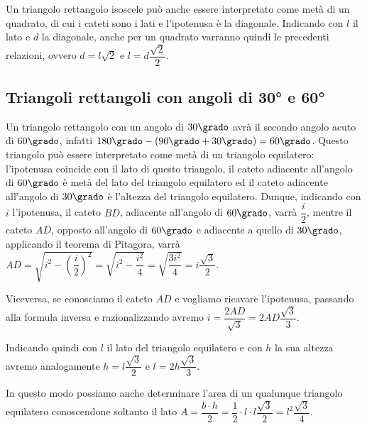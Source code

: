 Un triangolo rettangolo isoscele può anche essere interpretato come 
metà di un quadrato, di cui i cateti sono i lati e l'ipotenusa è la 
diagonale.
Indicando con $l$ il lato e $d$ la diagonale, anche per un quadrato 
varranno quindi le precedenti relazioni, ovvero $d=l\sqrt{2}$ e 
$l=d\dfrac{\sqrt{2}}{2}$.

\subsection{Triangoli rettangoli con angoli di 30° e 60°}

\begin{wrapfigure}{r}{0.25\textwidth}
	\centering
\end{wrapfigure}
Un triangolo rettangolo con un angolo di $30\grado$ avrà il secondo 
angolo acuto di $60\grado$, infatti $180\grado- 
(90\grado+30\grado)=60\grado$. Questo triangolo può essere 
interpretato come metà di un triangolo equilatero: l'ipotenusa 
coincide con il lato di questo triangolo, il cateto adiacente 
all'angolo di $60\grado$ è metà del lato del triangolo equilatero ed 
il cateto adiacente all'angolo di $30\grado$ è l'altezza del 
triangolo equilatero.
Dunque, indicando con $i$ l'ipotenusa, il cateto $BD$, adiacente 
all'angolo di $60\grado$, varrà $\dfrac{i}{2}$, mentre il cateto 
$AD$, opposto all'angolo di $60\grado$ e adiacente a quello di 
$30\grado$, applicando il teorema di Pitagora, varrà 
$AD=\sqrt{i^2-\left(\dfrac{i}{2}\right)^2}=\sqrt{i^2-\dfrac{i^2}{4}}
=\sqrt{\dfrac{3i^2}{4}}=i\dfrac{\sqrt{3}}{2}$.

Viceversa, se conosciamo il cateto $AD$ e vogliamo ricavare 
l'ipotenusa, passando alla formula inversa e razionalizzando avremo 
$i=\dfrac{2AD}{\sqrt{3}}=2AD\dfrac{\sqrt{3}}{3}$.

Indicando quindi con $l$ il lato del triangolo equilatero e con $h$ 
la sua altezza avremo analogamente $h=l\dfrac{\sqrt{3}}{2}$ e 
$l=2h\dfrac{\sqrt{3}}{3}$.

In questo modo possiamo anche determinare l'area di un qualunque 
triangolo equilatero conoscendone soltanto il lato $A=\dfrac{b\cdot 
h}{2}=\dfrac{1}{2}\cdot l\cdot 
l\dfrac{\sqrt{3}}{2}=l^2\dfrac{\sqrt{3}}{4}$.

